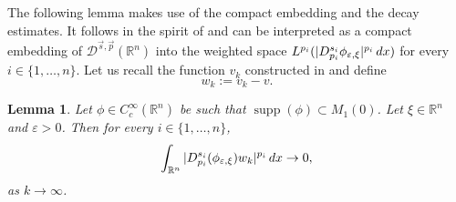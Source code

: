 \documentclass[11pt]{amsart}
\theoremstyle{plain}
\newtheorem{lemma}[theorem]{Lemma}
\theoremstyle{definition}
\numberwithin{equation}{section}
\renewcommand{\d}{\textnormal{d}}
\newcommand{\R}{\mathbb{R}}
\DeclareMathOperator{\supp}{supp}
\newcommand{\Dsp}{\mathcal{D}^{\vec{s},\vec{p}}(\mathbb{R}^n)}
\newcommand{\eps}{\varepsilon}
\begin{document}
The following lemma makes use of the compact embedding  and the decay estimates. 
It follows in the spirit of \cite[Lemma 2.4]{BSS18} and can be interpreted as a compact embedding of $\Dsp$ into the weighted space $L^{p_i}(\vert D^{s_i}_{p_i}\phi_{\eps,\xi}\vert^{p_i} \,\d x)$ for every $i \in \{1,\dots,n\}$. Let us recall the function $v_k$ constructed in  and define \[w_k := v_k - v.\]

\begin{lemma}
\label{lem:klimit}
Let $\phi \in C_c^{\infty}(\R^n)$ be such that $\supp(\phi) \subset M_1(0)$. Let $\xi \in \R^n$ and $\eps > 0$. 
Then for every $i \in \{1,\dots,n\}$,
\begin{equation*}
\int_{\R^n} \vert D_{p_i}^{s_i} (\phi_{\eps,\xi})w_k\vert^{p_i} \, \d x \to 0,
\end{equation*}
as $k \to \infty$.
\end{lemma}
\end{document}
